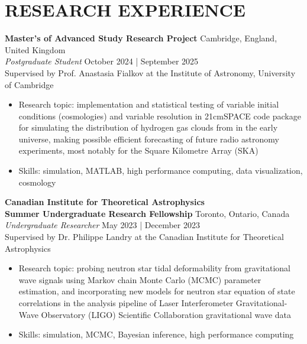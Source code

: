 \documentclass[a4paper,10pt]{extarticle}
\begin{document}
\section*{RESEARCH EXPERIENCE}
\textbf{Master's of Advanced Study Research Project} \hfill Cambridge, England, United Kingdom\\
\textit{Postgraduate Student} \hfill October 2024 | September 2025\\
Supervised by Prof. Anastasia Fialkov at the Institute of Astronomy, University of Cambridge
\begin{itemize}
    \item Research topic: implementation and statistical testing of variable initial conditions (cosmologies) and variable resolution in 21cmSPACE code package for simulating the distribution of hydrogen gas clouds from in the early universe, making possible efficient forecasting of future radio astronomy experiments, most notably for the Square Kilometre Array (SKA)
    
    \item Skills: simulation, MATLAB, high performance computing, data visualization, cosmology
\end{itemize}

\textbf{Canadian Institute for Theoretical Astrophysics\\
    Summer Undergraduate Research Fellowship} \hfill Toronto, Ontario, Canada\\
\textit{Undergraduate Researcher} \hfill May 2023 | December 2023\\
Supervised by Dr. Philippe Landry at the Canadian Institute for Theoretical Astrophysics
\begin{itemize}
    \item Research topic: probing neutron star tidal deformability from gravitational wave signals using Markov chain Monte Carlo (MCMC) parameter estimation, and incorporating new models for neutron star equation of state correlations in the analysis pipeline of Laser Interferometer Gravitational-Wave Observatory (LIGO) Scientific Collaboration gravitational wave data

    \item Skills: simulation, MCMC, Bayesian inference, high performance computing
\end{itemize}
\end{document}
